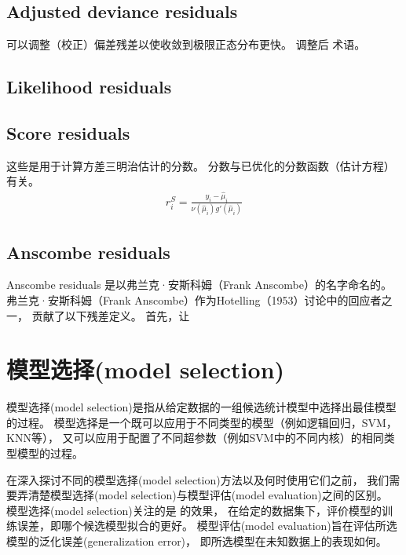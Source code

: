 \documentclass[letterpaper,10pt,english]{sphinxmanual}
\begin{document}
\subsection{Adjusted deviance residuals}
\label{\detokenize{_u6a21_u578b_u8bc4_u4f30/content:adjusted-deviance-residuals}}
可以调整（校正）偏差残差以使收敛到极限正态分布更快。 调整后
术语。


\subsection{Likelihood residuals}
\label{\detokenize{_u6a21_u578b_u8bc4_u4f30/content:likelihood-residuals}}

\subsection{Score residuals}
\label{\detokenize{_u6a21_u578b_u8bc4_u4f30/content:score-residuals}}
这些是用于计算方差三明治估计的分数。 分数与已优化的分数函数（估计方程）有关。
\begin{equation}\label{equation:模型评估/content:模型评估/content:33}
\begin{split}r_i^S = \frac{y_i-\hat{\mu}_i}{\nu(\hat{\mu}_i) g'(\hat{\mu}_i)}\end{split}
\end{equation}

\subsection{Anscombe residuals}
\label{\detokenize{_u6a21_u578b_u8bc4_u4f30/content:anscombe-residuals}}
Anscombe residuals 是以弗兰克·安斯科姆（Frank Anscombe）的名字命名的。
弗兰克·安斯科姆（Frank Anscombe）作为Hotelling（1953）讨论中的回应者之一，
贡献了以下残差定义。 首先，让


\section{模型选择(model selection)}
\label{\detokenize{_u6a21_u578b_u8bc4_u4f30/content:model-selection}}
模型选择(model selection)是指从给定数据的一组候选统计模型中选择出最佳模型的过程。
模型选择是一个既可以应用于不同类型的模型（例如逻辑回归，SVM，KNN等），
又可以应用于配置了不同超参数（例如SVM中的不同内核）的相同类型模型的过程。

在深入探讨不同的模型选择(model selection)方法以及何时使用它们之前，
我们需要弄清楚模型选择(model selection)与模型评估(model evaluation)之间的区别。
模型选择(model selection)关注的是  的效果，
在给定的数据集下，评价模型的训练误差，即哪个候选模型拟合的更好。
模型评估(model evaluation)旨在评估所选模型的泛化误差(generalization error)，
即所选模型在未知数据上的表现如何。
\end{document}

